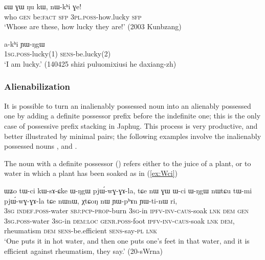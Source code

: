 \begin{exe}
\ex \label{ex:nWkhi.Ge}
\gll ɕɯ ɣɯ ŋu kɯ, nɯ-kʰi ɣe! \\
who \textsc{gen} be:\textsc{fact} \textsc{sfp} \textsc{3pl}.\textsc{poss}-how.lucky \textsc{sfp} \\
\glt `Whose are these, how lucky they are!' (2003 Kunbzang)
\end{exe}

\begin{exe}
\ex \label{ex:akhi.YWNgW}
\gll a-kʰi ɲɯ-ŋgɯ \\
\textsc{1sg}.\textsc{poss}-lucky(1) \textsc{sens}-be.lucky(2) \\
\glt `I am lucky.' (140425 shizi puluomixiusi he daxiang-zh)
\end{exe}

\subsubsection{Alienabilization} \label{sec:alienabilization}
 It is possible to turn an inalienably possessed noun into an alienably possessed one by adding a definite possessor prefix before the indefinite one; this is the only case of possessive prefix stacking in Japhug. This process is very productive, and better illustrated by minimal pairs; the following examples involve the inalienably possessed nouns ,  and .
 
The noun  with a definite possessor () refers either to the juice of a plant, or to water in which a plant has been soaked as in (\ref{ex:Wci})

 \begin{exe}
\ex \label{ex:Wci}
 \gll ɯʑo tɯ-ci kɯ-sɤ-ɕke ɯ-ŋgɯ pjɯ́-wɣ-ɣɤ-la, tɕe nɯ ɣɯ ɯ-ci ɯ-ŋgɯ nɯtɕu tɯ-mi pjɯ́-wɣ-ɣɤ-la tɕe nɯnɯ, χtɕoŋ nɯ ɲɯ-pʰɤn ɲɯ-ti-nɯ ri, \\
\textsc{3sg} \textsc{indef}.\textsc{poss}-water \textsc{sbj}:\textsc{pcp}-\textsc{prop}-burn \textsc{3sg}-in \textsc{ipfv}-\textsc{inv}-\textsc{caus}-soak \textsc{lnk} \textsc{dem} \textsc{gen} \textsc{3sg}.\textsc{poss}-water \textsc{3sg}-in \textsc{dem}:\textsc{loc} \textsc{genr}.\textsc{poss}-foot \textsc{ipfv}-\textsc{inv}-\textsc{caus}-soak \textsc{lnk} \textsc{dem}, rheumatism \textsc{dem} \textsc{sens}-be.efficient \textsc{sens}-say-\textsc{pl} \textsc{lnk} \\
 \glt `One puts it in hot water, and then one puts one's feet in that water, and it is efficient against rheumatism, they say.' (20-sWrna)
 \end{exe}

